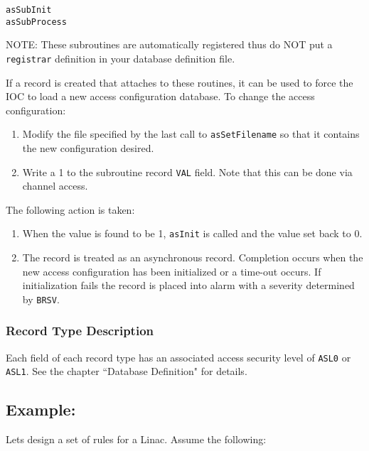 \begin{verbatim}
asSubInit
asSubProcess
\end{verbatim}
NOTE: These subroutines are automatically registered thus do NOT put a \verb|registrar| definition in your database 
definition file.

If a record is created that attaches to these routines, it can be used to force the IOC to load a new access configuration 
database. To change the access configuration:

\begin{enumerate}
\item Modify the file specified by the last call to \verb|asSetFilename| so that it contains the new configuration desired.

\item Write a 1 to the subroutine record \verb|VAL| field. Note that this can be done via channel access.

\end{enumerate}

The following action is taken:

\begin{enumerate}
\item When the value is found to be 1, \verb|asInit| is called and the value set back to 0.

\item The record is treated as an asynchronous record. Completion occurs when the new access configuration has been 
initialized or a time-out occurs. If initialization fails the record is placed into alarm with a severity determined by 
\verb|BRSV|.

\end{enumerate}

\subsubsection{Record Type Description}

Each field of each record type has an associated access security level of \verb|ASL0| or \verb|ASL1|. See the chapter ``Database 
Definition" for details.

\subsection{Example:}

Lets design a set of rules for a Linac. Assume the following:

